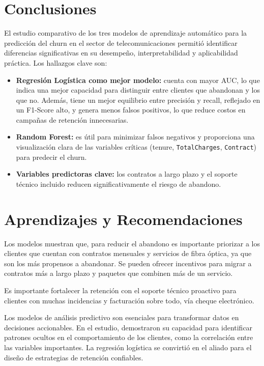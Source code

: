 \documentclass[conference]{IEEEtran}
\begin{document}
\section{Conclusiones}
El estudio comparativo de los tres modelos de aprendizaje automático para la predicción del churn en el sector de telecomunicaciones permitió identificar diferencias significativas en su desempeño, interpretabilidad y aplicabilidad práctica. Los hallazgos clave son:
\begin{itemize}
	\item \textbf{Regresión Logística como mejor modelo:} cuenta con mayor AUC, lo que indica una mejor capacidad para distinguir entre clientes que abandonan y los que no. Además, tiene un mejor equilibrio entre precisión y recall, reflejado en un F1-Score alto, y genera menos falsos positivos, lo que reduce costos en campañas de retención innecesarias.
	\item \textbf{Random Forest:} es útil para minimizar falsos negativos y proporciona una visualización clara de las variables críticas (tenure, \texttt{TotalCharges}, \texttt{Contract}) para predecir el churn.
	\item \textbf{Variables predictoras clave:} los contratos a largo plazo y el soporte técnico incluido reducen significativamente el riesgo de abandono.
\end{itemize}

\FloatBarrier
\section{Aprendizajes y Recomendaciones}

Los modelos muestran que, para reducir el abandono es importante priorizar a los clientes que cuentan con contratos mensuales y servicios de fibra óptica, ya que son los más propensos a abandonar. Se pueden ofrecer incentivos para migrar a contratos más a largo plazo y paquetes que combinen más de un servicio.

Es importante fortalecer la retención con el soporte técnico proactivo para clientes con muchas incidencias y facturación sobre todo, vía cheque electrónico.

Los modelos de análisis predictivo son esenciales para transformar datos en decisiones accionables. En el estudio, demostraron su capacidad para identificar patrones ocultos en el comportamiento de los clientes, como la correlación entre las variables importantes. La regresión logística se convirtió en el aliado para el diseño de estrategias de retención confiables. 
\end{document}
